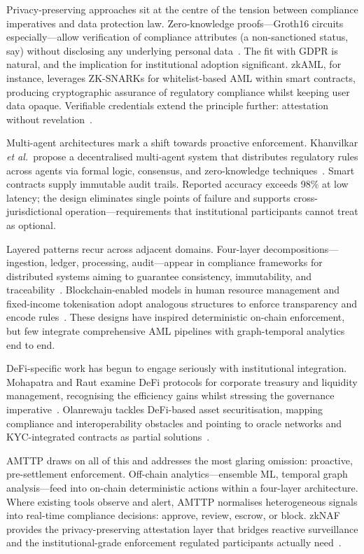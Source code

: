 \documentclass[journal]{IEEEtran}
\newcommand{\etal}{\textit{et al.}}
\begin{document}
Privacy-preserving approaches sit at the centre of the tension between compliance imperatives and data protection law. Zero-knowledge proofs---Groth16 circuits especially---allow verification of compliance attributes (a non-sanctioned status, say) without disclosing any underlying personal data~\cite{groth2016}. The fit with GDPR is natural, and the implication for institutional adoption significant. zkAML, for instance, leverages ZK-SNARKs for whitelist-based AML within smart contracts, producing cryptographic assurance of regulatory compliance whilst keeping user data opaque. Verifiable credentials extend the principle further: attestation without revelation~\cite{alego2025}.

Multi-agent architectures mark a shift towards proactive enforcement. Khanvilkar \etal\ propose a decentralised multi-agent system that distributes regulatory rules across agents via formal logic, consensus, and zero-knowledge techniques~\cite{khanvilkar2025}. Smart contracts supply immutable audit trails. Reported accuracy exceeds 98\% at low latency; the design eliminates single points of failure and supports cross-jurisdictional operation---requirements that institutional participants cannot treat as optional.

Layered patterns recur across adjacent domains. Four-layer decompositions---ingestion, ledger, processing, audit---appear in compliance frameworks for distributed systems aiming to guarantee consistency, immutability, and traceability~\cite{gade2025}. Blockchain-enabled models in human resource management and fixed-income tokenisation adopt analogous structures to enforce transparency and encode rules~\cite{madanchian2026}. These designs have inspired deterministic on-chain enforcement, but few integrate comprehensive AML pipelines with graph-temporal analytics end to end.

DeFi-specific work has begun to engage seriously with institutional integration. Mohapatra and Raut examine DeFi protocols for corporate treasury and liquidity management, recognising the efficiency gains whilst stressing the governance imperative~\cite{mohapatra2025}. Olanrewaju tackles DeFi-based asset securitisation, mapping compliance and interoperability obstacles and pointing to oracle networks and KYC-integrated contracts as partial solutions~\cite{olanrewaju2025}.

AMTTP draws on all of this and addresses the most glaring omission: proactive, pre-settlement enforcement. Off-chain analytics---ensemble ML, temporal graph analysis---feed into on-chain deterministic actions within a four-layer architecture. Where existing tools observe and alert, AMTTP normalises heterogeneous signals into real-time compliance decisions: approve, review, escrow, or block. zkNAF provides the privacy-preserving attestation layer that bridges reactive surveillance and the institutional-grade enforcement regulated participants actually need~\cite{fca2025,fatf2023}.
\end{document}
